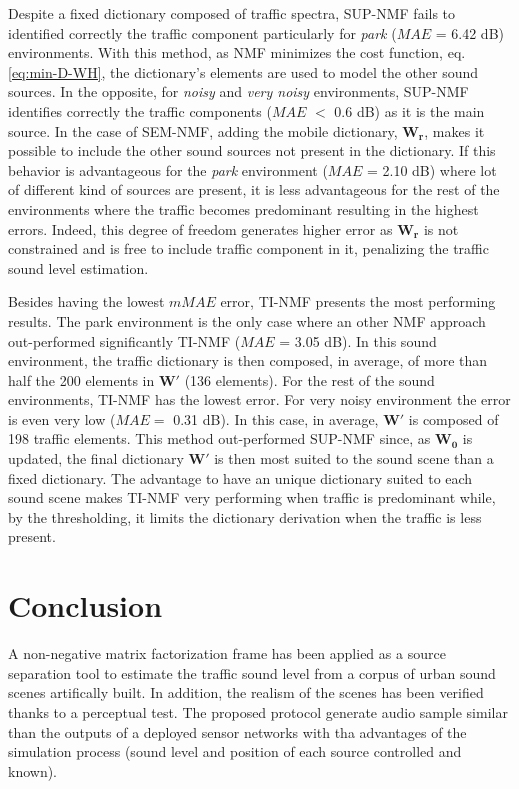 \documentclass[review,5p,twocolumn,sort&compress,times]{elsarticle}
\begin{document}
Despite a fixed dictionary composed of traffic spectra, SUP-NMF fails to identified correctly the traffic component particularly for \textit{park} ($MAE$ = 6.42 dB) environments. With this method, as NMF minimizes the cost function, eq. \ref{eq:min-D-WH}, the dictionary's elements are used to model the other sound sources. In the opposite, for \textit{noisy} and \textit{very noisy} environments, SUP-NMF identifies correctly the traffic components ($MAE$ $<$ 0.6 dB) as it is the main source. 
In the case of SEM-NMF, adding the mobile dictionary, $\mathbf{W_r}$, makes it possible to include the other sound sources not present in the dictionary. If this behavior is advantageous for the \textit{park} environment ($MAE$ = 2.10 dB) where lot of different kind of sources are present, it is less advantageous for the rest of the environments where the traffic becomes predominant resulting in the highest errors. Indeed, this degree of freedom generates higher error as $\mathbf{W_r}$ is not constrained and is free to include traffic component in it, penalizing the traffic sound level estimation.

Besides having the lowest $mMAE$ error, TI-NMF presents the most performing results. The park environment is the only case where an other NMF approach out-performed significantly TI-NMF ($MAE$ = 3.05 dB). In this sound environment, the traffic dictionary is then composed, in average, of more than half the 200 elements in $\mathbf{W'}$ (136 elements). For the rest of the sound environments, TI-NMF has the lowest error. For very noisy environment the error is even very low ($MAE=$ 0.31 dB). In this case, in average, $\mathbf{W'}$ is composed of 198 traffic elements. This method out-performed SUP-NMF since, as $\mathbf{W_0}$ is updated, the final dictionary $\mathbf{W'}$ is then most suited to the sound scene than a fixed dictionary. The advantage to have an unique dictionary suited to each sound scene makes TI-NMF very performing when traffic is predominant while, by the thresholding, it limits the dictionary derivation when the traffic is less present.

\section{Conclusion}

A non-negative matrix factorization frame has been applied as a source separation tool to estimate the traffic sound level  from a corpus of urban sound scenes artifically built. In addition, the realism of the scenes has been verified thanks to a perceptual test. The proposed protocol generate audio sample similar than the outputs of a deployed sensor networks with tha advantages of the simulation process (sound level and position of each source controlled and known).
\end{document}

